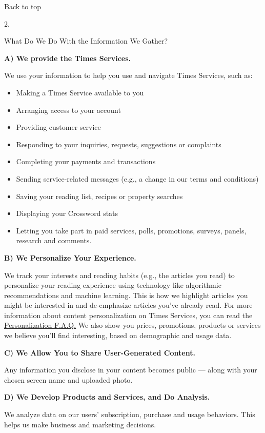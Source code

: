Back to top

2.

What Do We Do With the Information We Gather?

\textbf{A) We provide the Times Services.}

We use your information to help you use and navigate Times Services,
such as:

\begin{itemize}
\tightlist
\item
  Making a Times Service available to you
\item
  Arranging access to your account
\item
  Providing customer service
\item
  Responding to your inquiries, requests, suggestions or complaints
\item
  Completing your payments and transactions
\item
  Sending service-related messages (e.g., a change in our terms and
  conditions)
\item
  Saving your reading list, recipes or property searches
\item
  Displaying your Crossword stats
\item
  Letting you take part in paid services, polls, promotions, surveys,
  panels, research and comments.
\end{itemize}

\textbf{B) We Personalize Your Experience.}

We track your interests and reading habits (e.g., the articles you read)
to personalize your reading experience using technology like algorithmic
recommendations and machine learning. This is how we highlight articles
you might be interested in and de-emphasize articles you've already
read. For more information about content personalization on Times
Services, you can read the
\href{https://help.nytimes.com/hc/en-us/articles/360003965994-Personalization}{Personalization
F.A.Q.} We also show you prices, promotions, products or services we
believe you'll find interesting, based on demographic and usage data.

\textbf{C) We Allow You to Share User-Generated Content.}

Any information you disclose in your content becomes public --- along
with your chosen screen name and uploaded photo.

\textbf{D) We Develop Products and Services, and Do Analysis.}

We analyze data on our users' subscription, purchase and usage
behaviors. This helps us make business and marketing decisions.

